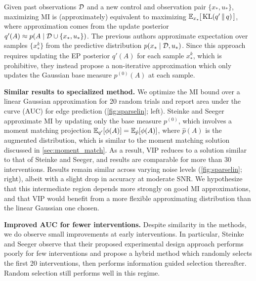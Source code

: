 Given past observations $\mathcal{D}$ and a new control and observation pair
$\{x_*,u_*\}$, maximizing MI is (approximately) equivalent to
maximizing \mbox{$\mathbb{E}_{x_*}\!\left[\, \mathrm{KL}(q'\,\|\,q) \,\right]$},
where approximation comes from the update posterior \mbox{$q'(A)
  \approx p(A \mid \mathcal{D} \cup \{x_*,u_*\})$}.  The previous authors
approximate expectation over samples $\{x_{*}^{k}\}$ from the
predictive distribution $p(x_{*} \mid \mathcal{D}, u_{*})$.  Since this
approach requires updating the EP posterior $q'(A)$ for each sample
$x_{*}^k$, which is prohibitive, they instead propose a
non-iterative approximation which only updates the Gaussian base measure
$p^{(0)}(A)$ at each sample.

\textbf{Similar results to specialized method.} We optimize the MI
bound over a linear Gaussian approximation for 20 random trials and
report area under the curve (AUC) for edge prediction
(\FIG\ref{fig:sparselin}; left).  Steinke and Seeger approximate MI by
updating only the base measure $p^{(0)}$, which involves a moment
matching projection $\mathbb{E}_{q'}[ \phi(A) ] = \mathbb{E}_{\hat{p}}[ \phi(A) ]$,
where $\hat{p}(A)$ is the augmented distribution, which is similar to
the moment matching solution discussed in \SEC\ref{sec:moment_match}.
As a result, VIP reduces to a solution similar to that of Steinke and
Seeger, and results are comparable for more than 30 interventions.
Results remain similar across varying noise levels
(\FIG\ref{fig:sparselin}; right), albeit with a slight drop in
accuracy at moderate SNR.  We hypothesize that this intermediate
region depends more strongly on good MI approximations, and that VIP
would benefit from a more flexible approximating distribution than the
linear Gaussian one chosen.


\textbf{Improved AUC for fewer interventions.}  Despite similarity in
the methods, we do observe small improvements at early interventions.
In particular, Steinke and Seeger observe that their proposed
experimental design approach performs poorly for few interventions and
propose a hybrid method which randomly selects the first 20
interventions, then performs information guided selection thereafter.
Random selection still performs well in this regime.


